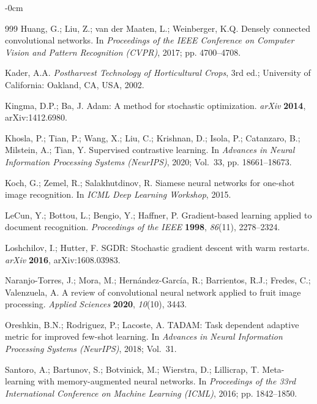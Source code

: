 \documentclass[preprint,12pt,authoryear]{elsarticle}
\begin{document}
\begin{adjustwidth}{-\extralength}{0cm}
\begin{thebibliography}{999}
Huang, G.; Liu, Z.; van der Maaten, L.; Weinberger, K.Q.
\newblock Densely connected convolutional networks.
\newblock In \emph{Proceedings of the IEEE Conference on Computer Vision and
  Pattern Recognition (CVPR)}, 2017; pp. 4700--4708.

Kader, A.A.
\newblock \emph{Postharvest Technology of Horticultural Crops}, 3rd ed.;
  University of California: Oakland, CA, USA, 2002.

Kingma, D.P.; Ba, J.
\newblock Adam: A method for stochastic optimization.
\newblock \emph{arXiv} \textbf{2014}, arXiv:1412.6980.

Khosla, P.; Tian, P.; Wang, X.; Liu, C.; Krishnan, D.; Isola, P.; Catanzaro, B.;
  Milstein, A.; Tian, Y.
\newblock Supervised contrastive learning.
\newblock In \emph{Advances in Neural Information Processing Systems (NeurIPS)},
  2020; Vol.~33, pp. 18661--18673.

Koch, G.; Zemel, R.; Salakhutdinov, R.
\newblock Siamese neural networks for one-shot image recognition.
\newblock In \emph{ICML Deep Learning Workshop}, 2015.

LeCun, Y.; Bottou, L.; Bengio, Y.; Haffner, P.
\newblock Gradient-based learning applied to document recognition.
\newblock \emph{Proceedings of the IEEE} \textbf{1998}, \emph{86}(11), 2278--2324.

Loshchilov, I.; Hutter, F.
\newblock SGDR: Stochastic gradient descent with warm restarts.
\newblock \emph{arXiv} \textbf{2016}, arXiv:1608.03983.

Naranjo-Torres, J.; Mora, M.; Hern\'{a}ndez-Garc\'{i}a, R.; Barrientos, R.J.;
  Fredes, C.; Valenzuela, A.
\newblock A review of convolutional neural network applied to fruit image
  processing.
\newblock \emph{Applied Sciences} \textbf{2020}, \emph{10}(10), 3443.

Oreshkin, B.N.; Rodriguez, P.; Lacoste, A.
\newblock TADAM: Task dependent adaptive metric for improved few-shot learning.
\newblock In \emph{Advances in Neural Information Processing Systems (NeurIPS)},
  2018; Vol.~31.

Santoro, A.; Bartunov, S.; Botvinick, M.; Wierstra, D.; Lillicrap, T.
\newblock Meta-learning with memory-augmented neural networks.
\newblock In \emph{Proceedings of the 33rd International Conference on Machine
  Learning (ICML)}, 2016; pp. 1842--1850.


\end{thebibliography}
\end{adjustwidth}
\end{document}
